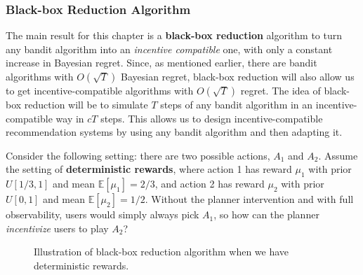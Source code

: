 \documentclass[
  letterpaper,
  numbers=noenddot,
  DIV=11]{scrreprt}
\theoremstyle{definition}
\theoremstyle{plain}
\theoremstyle{plain}
\theoremstyle{remark}
\begin{document}
\subsubsection*{Black-box Reduction
Algorithm}\label{black-box-reduction-algorithm}

The main result for this chapter is a \textbf{black-box reduction}
algorithm to turn any bandit algorithm into an \emph{incentive
compatible} one, with only a constant increase in Bayesian regret.
Since, as mentioned earlier, there are bandit algorithms with
\(O(\sqrt{T})\) Bayesian regret, black-box reduction will also allow us
to get incentive-compatible algorithms with \(O(\sqrt{T})\) regret. The
idea of black-box reduction will be to simulate \(T\) steps of any
bandit algorithm in an incentive-compatible way in \(c T\) steps. This
allows us to design incentive-compatible recommendation systems by using
any bandit algorithm and then adapting it.

Consider the following setting: there are two possible actions, \(A_1\)
and \(A_2\). Assume the setting of \textbf{deterministic rewards}, where
action 1 has reward \(\mu_1\) with prior \(U[1/3, 1]\) and mean
\(\mathbb{E}[\mu_1] = 2/3\), and action 2 has reward \(\mu_2\) with
prior \(U[0, 1]\) and mean \(\mathbb{E}[\mu_2] = 1/2\). Without the
planner intervention and with full observability, users would simply
always pick \(A_1\), so how can the planner \emph{incentivize} users to
play \(A_2\)?

\begin{figure}


\caption{\label{fig-deterministic-guinea-pig}Illustration of black-box
reduction algorithm when we have deterministic rewards.}

\end{figure}%
\end{document}
